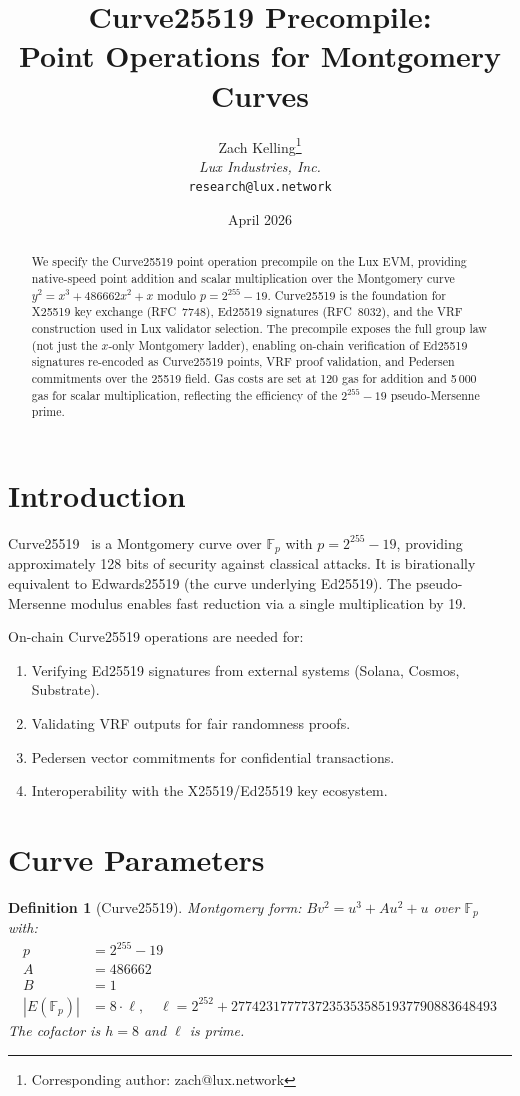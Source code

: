 \documentclass[11pt,a4paper]{article}
\title{Curve25519 Precompile:\\Point Operations for Montgomery Curves}
\author{
Zach Kelling\thanks{Corresponding author: zach@lux.network}\\
\textit{Lux Industries, Inc.}\\
\texttt{research@lux.network}
}
\date{April 2026}
\newtheorem{definition}{Definition}
\begin{document}
\luxcoverpage

\begin{abstract}
We specify the Curve25519 point operation precompile on the Lux EVM, providing
native-speed point addition and scalar multiplication over the Montgomery curve
$y^2 = x^3 + 486662 x^2 + x$ modulo $p = 2^{255} - 19$. Curve25519 is the
foundation for X25519 key exchange (RFC~7748), Ed25519 signatures (RFC~8032),
and the VRF construction used in Lux validator selection. The precompile exposes
the full group law (not just the $x$-only Montgomery ladder), enabling on-chain
verification of Ed25519 signatures re-encoded as Curve25519 points, VRF proof
validation, and Pedersen commitments over the 25519 field. Gas costs are set at
120 gas for addition and 5\,000 gas for scalar multiplication, reflecting the
efficiency of the $2^{255}-19$ pseudo-Mersenne prime.
\end{abstract}

\section{Introduction}

Curve25519~\cite{bernstein-curve25519} is a Montgomery curve over $\mathbb{F}_p$
with $p = 2^{255} - 19$, providing approximately 128 bits of security against
classical attacks. It is birationally equivalent to Edwards25519 (the curve
underlying Ed25519). The pseudo-Mersenne modulus enables fast reduction via
a single multiplication by 19.

On-chain Curve25519 operations are needed for:
\begin{enumerate}[label=(\roman*)]
  \item Verifying Ed25519 signatures from external systems (Solana, Cosmos, Substrate).
  \item Validating VRF outputs for fair randomness proofs.
  \item Pedersen vector commitments for confidential transactions.
  \item Interoperability with the X25519/Ed25519 key ecosystem.
\end{enumerate}

\section{Curve Parameters}

\begin{definition}[Curve25519]
Montgomery form: $B v^2 = u^3 + A u^2 + u$ over $\mathbb{F}_p$ with:
\begin{align}
  p &= 2^{255} - 19 \\
  A &= 486662 \\
  B &= 1 \\
  |E(\mathbb{F}_p)| &= 8 \cdot \ell, \quad \ell = 2^{252} + 27742317777372353535851937790883648493
\end{align}
The cofactor is $h = 8$ and $\ell$ is prime.
\end{definition}
\end{document}
